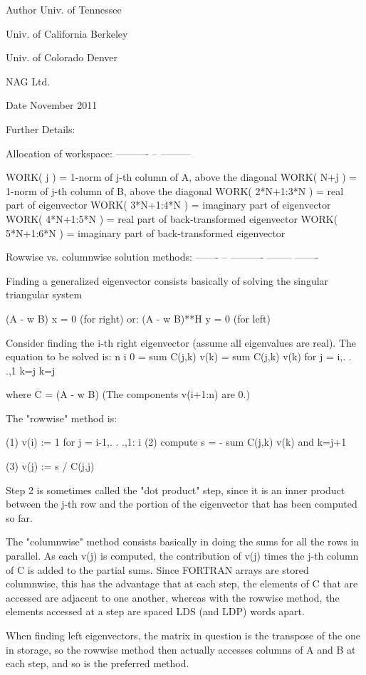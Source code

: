 \begin{DoxyAuthor}{Author}
Univ. of Tennessee 

Univ. of California Berkeley 

Univ. of Colorado Denver 

N\+A\+G Ltd. 
\end{DoxyAuthor}
\begin{DoxyDate}{Date}
November 2011 
\end{DoxyDate}
\begin{DoxyParagraph}{Further Details\+: }
\begin{DoxyVerb}  Allocation of workspace:
  ---------- -- ---------

     WORK( j ) = 1-norm of j-th column of A, above the diagonal
     WORK( N+j ) = 1-norm of j-th column of B, above the diagonal
     WORK( 2*N+1:3*N ) = real part of eigenvector
     WORK( 3*N+1:4*N ) = imaginary part of eigenvector
     WORK( 4*N+1:5*N ) = real part of back-transformed eigenvector
     WORK( 5*N+1:6*N ) = imaginary part of back-transformed eigenvector

  Rowwise vs. columnwise solution methods:
  ------- --  ---------- -------- -------

  Finding a generalized eigenvector consists basically of solving the
  singular triangular system

   (A - w B) x = 0     (for right) or:   (A - w B)**H y = 0  (for left)

  Consider finding the i-th right eigenvector (assume all eigenvalues
  are real). The equation to be solved is:
       n                   i
  0 = sum  C(j,k) v(k)  = sum  C(j,k) v(k)     for j = i,. . .,1
      k=j                 k=j

  where  C = (A - w B)  (The components v(i+1:n) are 0.)

  The "rowwise" method is:

  (1)  v(i) := 1
  for j = i-1,. . .,1:
                          i
      (2) compute  s = - sum C(j,k) v(k)   and
                        k=j+1

      (3) v(j) := s / C(j,j)

  Step 2 is sometimes called the "dot product" step, since it is an
  inner product between the j-th row and the portion of the eigenvector
  that has been computed so far.

  The "columnwise" method consists basically in doing the sums
  for all the rows in parallel.  As each v(j) is computed, the
  contribution of v(j) times the j-th column of C is added to the
  partial sums.  Since FORTRAN arrays are stored columnwise, this has
  the advantage that at each step, the elements of C that are accessed
  are adjacent to one another, whereas with the rowwise method, the
  elements accessed at a step are spaced LDS (and LDP) words apart.

  When finding left eigenvectors, the matrix in question is the
  transpose of the one in storage, so the rowwise method then
  actually accesses columns of A and B at each step, and so is the
  preferred method.\end{DoxyVerb}
 
\end{DoxyParagraph}
